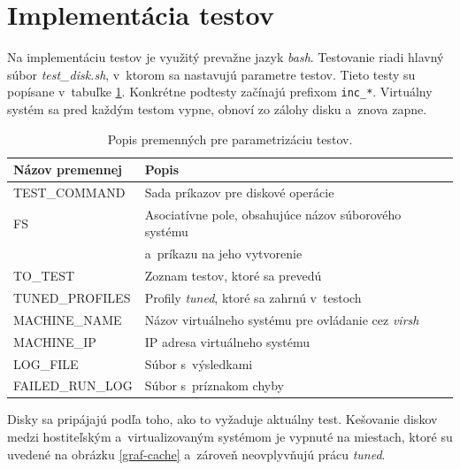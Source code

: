 %
%

\section{Implementácia testov}

Na implementáciu testov je využitý prevažne jazyk \emph{bash}. Testovanie riadi
hlavný súbor \emph{test\_disk.sh}, v~ktorom sa nastavujú parametre testov.
Tieto testy su popísane v~tabuľke \ref{tab:test-params}. Konkrétne podtesty
začínajú prefixom \texttt{inc\_*}. Virtuálny systém sa pred každým testom
vypne, obnoví zo zálohy disku a~znova zapne.

\begin{table}[H]
\begin{center}
\begin{tabular}{|l|l|}
    \hline
    \textbf{Názov premennej} & \textbf{Popis} \\
    \hline
    TEST\_COMMAND       & Sada príkazov pre diskové operácie \\
    FS                  & Asociatívne pole, obsahujúce názov súborového systému \\
                        & a~príkazu na jeho vytvorenie \\
    TO\_TEST            & Zoznam testov, ktoré sa prevedú \\
    TUNED\_PROFILES     & Profily \emph{tuned}, ktoré sa zahrnú v~testoch \\
    MACHINE\_NAME       & Názov virtuálneho systému pre ovládanie cez \emph{virsh} \\
    MACHINE\_IP         & IP adresa virtuálneho systému \\
    LOG\_FILE           & Súbor s~výsledkami \\
    FAILED\_RUN\_LOG    & Súbor s~príznakom chyby \\
    \hline
\end{tabular}
\caption{Popis premenných pre parametrizáciu testov.}
\label{tab:test-params}
\end{center}
\end{table}

Disky sa pripájajú podľa toho, ako to vyžaduje aktuálny test. Kešovanie diskov
medzi hostiteľským a~virtualizovaným systémom je vypnuté na miestach, ktoré su
uvedené na obrázku \ref{graf-cache} a~zároveň neovplyvňujú prácu \emph{tuned}. 

%
%

